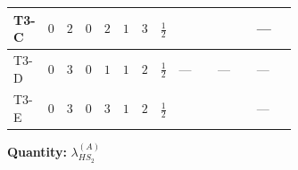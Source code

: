 \documentclass[8pt]{article}
\begin{document}
\begin{landscape}
\begin{longtable}{@{}llcccccc >{\raggedright\arraybackslash}p{0.21\linewidth} >{\raggedright\arraybackslash}p{0.21\linewidth} >{\raggedright\arraybackslash}p{0.21\linewidth}@{}}
\midrule
T3-C & $0$ & $2$ & $0$ & $2$ & $1$ & $3$ & $\frac{1}{2}$ & \scriptsize\adjustbox{max width=\linewidth}{$\begin{gathered} +8 {\lambda_{HS_2}^{(1)}} {\lambda_{HS_2}^{(A)}}\end{gathered}$} & \scriptsize\adjustbox{max width=\linewidth}{$\begin{gathered} +2 {\lambda_{HS_2}^{(A)}} {\lambda_{S_2}^{(1)}}\end{gathered}$} & --- \\
\midrule
T3-D & $0$ & $3$ & $0$ & $1$ & $1$ & $2$ & $\frac{1}{2}$ & --- & --- & --- \\
\midrule
T3-E & $0$ & $3$ & $0$ & $3$ & $1$ & $2$ & $\frac{1}{2}$ & \scriptsize\adjustbox{max width=\linewidth}{$\begin{gathered} +8 {\lambda_{HS_2}^{(1)}} {\lambda_{HS_2}^{(A)}}\end{gathered}$} & \scriptsize\adjustbox{max width=\linewidth}{$\begin{gathered} +2 {\lambda_{HS_2}^{(A)}} {\lambda_{S_2}^{(1)}}\end{gathered}$} & --- \\
\midrule
\bottomrule
\end{longtable}
\clearpage
\noindent\textbf{Quantity: }$\lambda_{HS_2}^{(A)}$\par\smallskip

\end{landscape}
\end{document}
